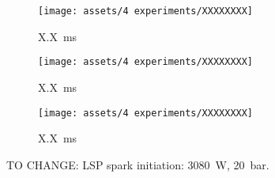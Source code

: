 \begin{figure}[!ht]
    \centering
    \begin{subfigure}[t]{0.3\textwidth}
        \centering
        \texttt{[image: assets/4 experiments/XXXXXXXX]}
        \caption{\qty{X.X}{ms}}
    \end{subfigure}
    \hfill
    \begin{subfigure}[t]{0.3\textwidth}
        \centering
        \texttt{[image: assets/4 experiments/XXXXXXXX]}
        \caption{\qty{X.X}{ms}}
    \end{subfigure}
    \hfill
    \begin{subfigure}[t]{0.3\textwidth}
        \centering
        \texttt{[image: assets/4 experiments/XXXXXXXX]}
        \caption{\qty{X.X}{ms}}
    \end{subfigure}
    \caption{TO CHANGE: LSP spark initiation: \qty{3080}{W}, \qty{20}{bar}. }
    \label{fig:CW_V2_Photron_frames}
\end{figure}